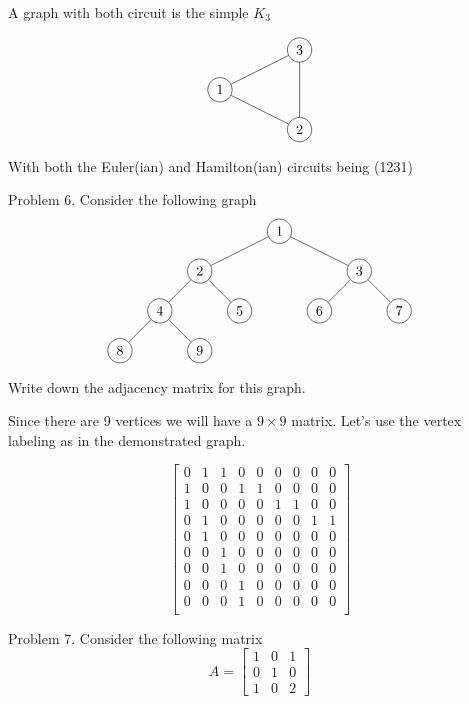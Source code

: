 \documentclass[16 pt]{amsart}
\theoremstyle{definition}
\theoremstyle{remark}
\numberwithin{equation}{subsection}
\begin{document}
A graph with both circuit is the simple $K_3$

\[
\begin{tikzpicture}
\node[circle,draw] (1) at (0,0){1};
\node[circle,draw] (2) at (2,-1){2};
\node[circle,draw] (3) at (2,1){3};
\foreach \from/\to in {1/2,1/3,2/3}
  \draw (\from) -- (\to);
\end{tikzpicture}
\]

With both the Euler(ian) and Hamilton(ian) circuits being (1231)


\newpage

Problem 6. Consider the following graph
\[
\begin{tikzpicture}
\node[circle,draw] (1) at (4,3){1};
\node[circle,draw] (2) at (2,2){2};
\node[circle,draw] (3) at (6,2){3};
\node[circle,draw] (4) at (1,1){4};
\node[circle,draw] (5) at (3,1){5};
\node[circle,draw] (6) at (5,1){6};
\node[circle,draw] (7) at (7,1){7};
\node[circle,draw] (8) at (0,0){8};
\node[circle,draw] (9) at (2,0){9};
\foreach \from/\to in {1/2,1/3,2/4,2/5,3/6,3/7,4/8,4/9}
  \draw (\from) -- (\to);
\end{tikzpicture}
\]

Write down the adjacency matrix for this graph.

\vspace{1in}
Since there are 9 vertices we will have a $9\times 9$ matrix.  Let's use the vertex labeling as in the demonstrated graph.

\[
\begin{bmatrix}
0 & 1 & 1 & 0 & 0 & 0 & 0 & 0 & 0\\
1 & 0 & 0 & 1 & 1 & 0 & 0 & 0 & 0\\
1 & 0 & 0 & 0 & 0 & 1 & 1 & 0 & 0\\
0 & 1 & 0 & 0 & 0 & 0 & 0 & 1 & 1\\
0 & 1 & 0 & 0 & 0 & 0 & 0 & 0 & 0\\
0 & 0 & 1 & 0 & 0 & 0 & 0 & 0 & 0\\
0 & 0 & 1 & 0 & 0 & 0 & 0 & 0 & 0\\
0 & 0 & 0 & 1 & 0 & 0 & 0 & 0 & 0\\
0 & 0 & 0 & 1 & 0 & 0 & 0 & 0 & 0\\
\end{bmatrix}
\]

\newpage

Problem 7. Consider the following matrix
\[
A = \begin{bmatrix}
1 & 0 & 1\\
0 & 1 & 0\\
1 & 0 & 2
\end{bmatrix}
\]
\end{document}
